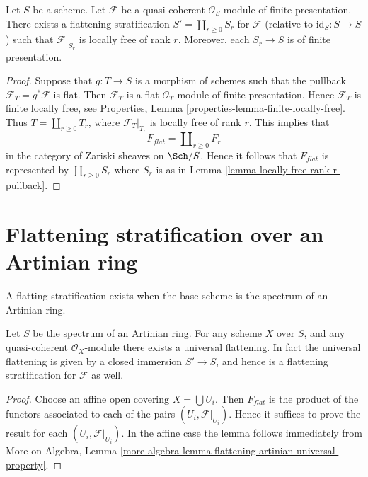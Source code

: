 \begin{lemma}
\label{lemma-finite-presentation-module}
Let $S$ be a scheme. Let $\mathcal{F}$ be a quasi-coherent
$\mathcal{O}_S$-module of finite presentation.
There exists a flattening stratification $S' = \coprod_{r \geq 0} S_r$
for $\mathcal{F}$ (relative to $\text{id}_S : S \to S$) such that
$\mathcal{F}|_{S_r}$ is locally free of rank $r$. Moreover, each
$S_r \to S$ is of finite presentation.
\end{lemma}

\begin{proof}
Suppose that $g : T \to S$ is a morphism of schemes such that the pullback
$\mathcal{F}_T = g^*\mathcal{F}$ is flat. Then $\mathcal{F}_T$ is a flat
$\mathcal{O}_T$-module of finite presentation. Hence
$\mathcal{F}_T$ is finite locally free, see
Properties, Lemma \ref{properties-lemma-finite-locally-free}.
Thus $T = \coprod_{r \geq 0} T_r$, where $\mathcal{F}_T|_{T_r}$ is locally
free of rank $r$. This implies that
$$
F_{flat} = \coprod\nolimits_{r \geq 0} F_r
$$
in the category of Zariski sheaves on $\Sch/S$. Hence it follows
that $F_{flat}$ is represented by $\coprod_{r \geq 0} S_r$ where
$S_r$ is as in
Lemma \ref{lemma-locally-free-rank-r-pullback}.
\end{proof}



\section{Flattening stratification over an Artinian ring}
\label{section-flattening-artinian}

\noindent
A flatting stratification exists when the base scheme is the spectrum
of an Artinian ring.

\begin{lemma}
\label{lemma-flattening-stratification-artinian}
Let $S$ be the spectrum of an Artinian ring.
For any scheme $X$ over $S$, and any quasi-coherent $\mathcal{O}_X$-module
there exists a universal flattening. In fact the universal flattening
is given by a closed immersion $S' \to S$, and hence is a flattening
stratification for $\mathcal{F}$ as well.
\end{lemma}

\begin{proof}
Choose an affine open covering $X = \bigcup U_i$.
Then $F_{flat}$ is the product of the functors associated to
each of the pairs $(U_i, \mathcal{F}|_{U_i})$.
Hence it suffices to prove the result for each
$(U_i, \mathcal{F}|_{U_i})$.
In the affine case the lemma follows immediately from
More on Algebra,
Lemma \ref{more-algebra-lemma-flattening-artinian-universal-property}.
\end{proof}







